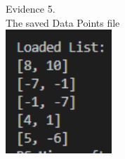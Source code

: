 \begin{flushleft}
\begin{center}
        {\large Evidence 5.\rn } \\ 
        \vspace{0.3cm}
        The saved Data Points file \\
        \includegraphics[width=4cm]{Images/Testing/T4.9.1.PNG} \\
    \end{center}
   
\end{flushleft}
